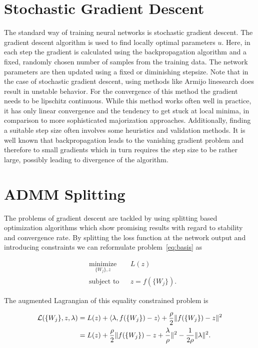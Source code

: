 \documentclass[english,11pt,a4paper]{article}
\begin{document}
\section{Stochastic Gradient Descent}

The standard way of training neural networks is stochastic gradient descent. The gradient descent algorithm is used to find locally optimal parameters $u$. Here, in each step the gradient is calculated using the backpropagation algorithm and a fixed, randomly chosen number of samples from the training data. The network parameters are then updated using a fixed or diminishing stepsize. Note that in the case of stochastic gradient descent, using methods like Armijo linesearch does result in unstable behavior. For the convergence of this method the gradient needs to be lipschitz continuous. While this method works often well in practice, it has only linear convergence and the tendency to get stuck at local minima, in comparison to more sophisticated majorization approaches. Additionally, finding a suitable step size often involves some heuristics and validation methods. It is well known that backpropagation leads to the vanishing gradient problem and therefore to small gradients which in turn requires the step size to be rather large, possibly leading to divergence of the algorithm.

\section{ADMM Splitting}
\label{sec:last-layer_splitting}

The problems of gradient descent are tackled by using splitting based optimization algorithms \cites{carreira2014distributed,taylor2016training} which show promising results with regard to stability and convergence rate. By splitting the loss function at the network output and introducing constraints we can reformulate problem~\ref{eq:basis} as

\begin{equation}
	\begin{aligned}
		& \underset{\{W_j\},z}{\text{minimize}}
		&& L(z) \\
		& \text{subject to}
		&& z = f(\{W_j\}).
	\end{aligned}
	\label{eq:last-layer_splitting_problem}
\end{equation}

The augmented Lagrangian of this equality constrained problem is

\begin{equation}
	\begin{aligned}
		\mathcal{L}(\{W_j\}, z, \lambda)
		&= L(z) + \langle \lambda, f(\{W_j\})-z \rangle + \frac{\rho}{2} \| f(\{W_j\})-z \|^2 \\
		&= L(z) + \frac{\rho}{2} \| f(\{W_j\}) - z + \frac{\lambda}{\rho} \|^2 - \frac{1}{2 \rho} \| \lambda \|^2.
	\end{aligned}
\end{equation}
\end{document}
